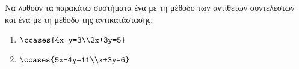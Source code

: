 Να λυθούν τα παρακάτω συστήματα ένα με τη μέθοδο των αντίθετων συντελεστών και ένα με τη μέθοδο της αντικατάστασης.
\begin{multicols}{2}
\begin{enumerate}[label=\roman*.,itemsep=0mm]
\item $\ccases{4x-y=3\\2x+3y=5}$
\item $\ccases{5x-4y=11\\x+3y=6}$
\end{enumerate}\end{multicols}